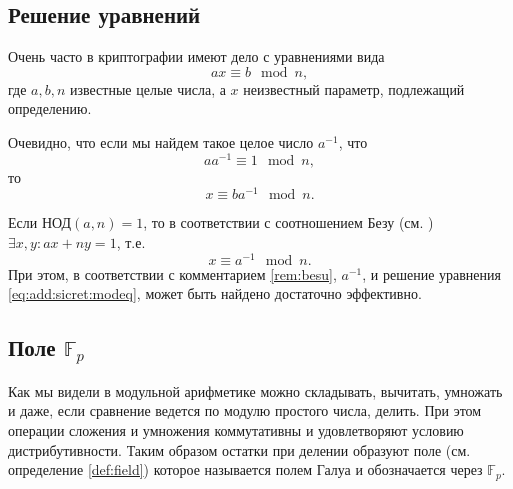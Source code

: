 \subsection{Решение уравнений}
\label{sec:add:discretmath:mod:equationsolve}
Очень часто в криптографии имеют дело с уравнениями вида
\begin{equation}
a x \equiv b \mod n,
\label{eq:add:sicret:modeq}
\end{equation}
где $a, b, n$ известные целые числа, а $x$ неизвестный параметр,
подлежащий определению.

Очевидно, что если мы найдем такое целое число $a^{-1}$, что 
\[
a a^{-1} \equiv 1 \mod n,
\]
то
\[
x \equiv b a^{-1} \mod n.
\]

Если $\mbox{НОД}\left(a, n\right) = 1$, то в соответствии с
соотношением Безу (см. ) 
$\exists x, y: a x + n y = 1$, т.е. 
\[
x \equiv a^{-1} \mod n.
\]
При этом, в соответствии с комментарием \ref{rem:besu}, $a^{-1}$, и
решение уравнения \eqref{eq:add:sicret:modeq}, может быть найдено
достаточно эффективно.

\subsection{Поле $\mathbb{F}_p$}
\label{sec:add:diskretmath:mod:fp}
Как мы видели в модульной арифметике можно складывать, вычитать,
умножать и даже, если сравнение ведется по модулю простого числа,
делить. При этом операции сложения и умножения коммутативны и
удовлетворяют условию дистрибутивности. Таким образом остатки при
делении образуют поле  (см. 
определение \ref{def:field}) которое 
называется полем Галуа и обозначается через $\mathbb{F}_p$.
